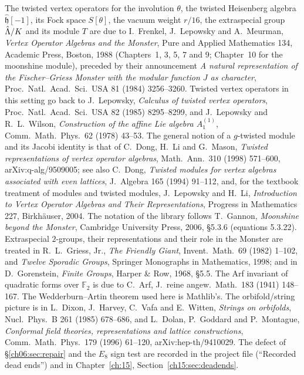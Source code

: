 The twisted vertex operators for the involution $\theta$, the twisted Heisenberg algebra
$\hat{\mathfrak h}[-1]$, its Fock space $S[\theta]$, the vacuum weight $r/16$, the extraspecial group
$\hat{{\Lambda}}/K$ and its module $T$ are due to I.~Frenkel, J.~Lepowsky and A.~Meurman, \emph{Vertex
Operator Algebras and the Monster}, Pure and Applied Mathematics 134, Academic Press, Boston, 1988
(Chapters~1, 3, 5, 7 and 9; Chapter~10 for the moonshine module), preceded by their announcement
\emph{A natural representation of the Fischer--Griess Monster with the modular function $J$ as
character}, Proc.\ Natl.\ Acad.\ Sci.\ USA 81 (1984) 3256--3260.  Twisted vertex operators in this
setting go back to J.~Lepowsky, \emph{Calculus of twisted vertex operators}, Proc.\ Natl.\ Acad.\
Sci.\ USA 82 (1985) 8295--8299, and J.~Lepowsky and R.~L.~Wilson, \emph{Construction of the affine
Lie algebra $A_1^{(1)}$}, Comm.\ Math.\ Phys.\ 62 (1978) 43--53.  The general notion of a $g$-twisted
module and its Jacobi identity is that of C.~Dong, H.~Li and G.~Mason, \emph{Twisted
representations of vertex operator algebras}, Math.\ Ann.\ 310 (1998) 571--600, arXiv:q-alg/9509005;
see also C.~Dong, \emph{Twisted modules for vertex algebras associated with even lattices}, J.\
Algebra 165 (1994) 91--112, and, for the textbook treatment of modules and twisted modules,
J.~Lepowsky and H.~Li, \emph{Introduction to Vertex Operator Algebras and Their Representations},
Progress in Mathematics 227, Birkh\"auser, 2004.  The notation of the library follows T.~Gannon,
\emph{Moonshine beyond the Monster}, Cambridge University Press, 2006, \S5.3.6 (equations 5.3.22).
Extraspecial $2$-groups, their representations and their role in the Monster are treated in
R.~L.~Griess, Jr., \emph{The Friendly Giant}, Invent.\ Math.\ 69 (1982) 1--102, and \emph{Twelve
Sporadic Groups}, Springer Monographs in Mathematics, 1998; and in D.~Gorenstein, \emph{Finite
Groups}, Harper \& Row, 1968, \S5.5.  The Arf invariant of quadratic forms over $\mathbb F_2$ is
due to C.~Arf, J.\ reine angew.\ Math.\ 183 (1941) 148--167.  The Wedderburn--Artin theorem used
here is Mathlib's.  The orbifold/string picture is in L.~Dixon, J.~Harvey, C.~Vafa and E.~Witten,
\emph{Strings on orbifolds}, Nucl.\ Phys.\ B 261 (1985) 678--686, and L.~Dolan, P.~Goddard and
P.~Montague, \emph{Conformal field theories, representations and lattice constructions}, Comm.\
Math.\ Phys.\ 179 (1996) 61--120, arXiv:hep-th/9410029.  The defect of \S\ref{ch06:sec:repair} and
the $E_8$ sign test are recorded in the project file \leanpath{Notes/MonsterRoadmap.md} (``Recorded dead ends'') and
in Chapter~\ref{ch:15}, Section~\ref{ch15:sec:deadends}.

\endgroup
